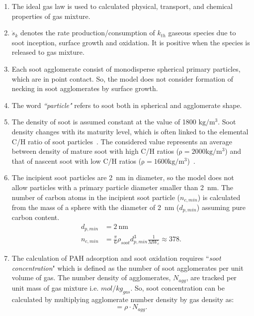 \begin{enumerate}
\item The ideal gas law is used to calculated physical, transport, and chemical properties of gas mixture.
	
\item ${\dot{s}_k}$ denotes the rate production/consumption of $k_{th}$ gaseous species due to soot inception, surface growth and oxidation. It is positive when the species is released to gas mixture.

\item Each soot agglomerate consist of monodisperse spherical primary particles, which are in point contact. So, the model does not consider formation of necking in soot agglomerates by surface growth.

\item The word \textit{``particle"} refers to soot both in spherical and agglomerate shape. 

\item The density of soot is assumed constant at the value of 1800 $\mathrm{kg/m^3}$. Soot density changes with its maturity level, which is often linked to the elemental C/H ratio of soot particles~\citep{michelsen2021effects}. The considered value represents an average between density of mature soot with high C/H ratios ($\mathrm{\rho=2000 kg/m^3}$) and that of nascent soot with low C/H ratios ($\mathrm{\rho=1600 kg/m^3}$)~\citep{jensen2007measurement, michelsen2021effects}.

\item The incipient soot particles are 2~nm in diameter, so the model does not allow particles with a primary particle diameter smaller than 2~nm. The number of carbon atoms in the incipient soot particle ($n_{c,min}$) is calculated from the mass of a sphere with the diameter of 2~nm ($d_{p,min}$) assuming pure carbon content.
\begin{equation}
	\begin{split}
	d_{p,min}&=2~\mathrm{nm} \\
	n_{c,min}& =\frac{\pi}{6}\rho_{soot}d^3_{p,min}\frac{1}{MW_c}\approx378
	\label{eqn:dp_min}.
	\end{split}
\end{equation}
\item The calculation of PAH adsorption and soot oxidation requires ``\textit{soot concentration}" which is defined as the number of soot agglomerates per unit volume of gas. The number density of agglomerates,  ${N_{agg}}$, are tracked per unit mass of gas mixture i.e. ${mol/kg_{gas}}$. So, soot concentration can be calculated by multiplying agglomerate number density by gas density as:
\begin{equation}
	[\mathrm{soot}] = \rho\cdot {N_{agg}}
	\label{eqn:sootconcen}.
\end{equation}


\end{enumerate}
